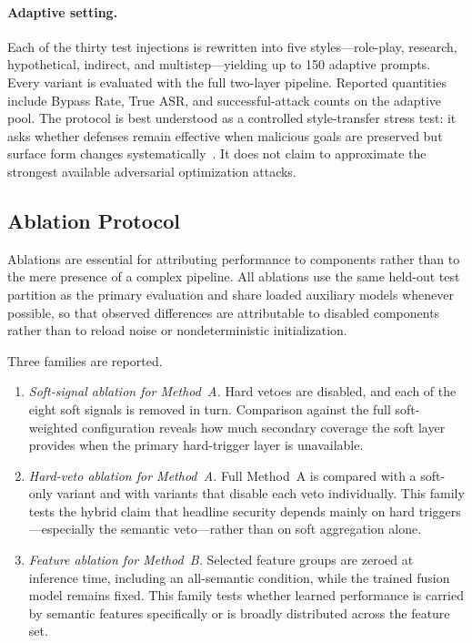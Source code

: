 \documentclass{article}
\begin{document}
\paragraph{Adaptive setting.}
Each of the thirty test injections is rewritten into five styles---role-play, research, hypothetical, indirect, and multistep---yielding up to 150 adaptive prompts.
Every variant is evaluated with the full two-layer pipeline.
Reported quantities include Bypass Rate, True ASR, and successful-attack counts on the adaptive pool.
The protocol is best understood as a controlled style-transfer stress test: it asks whether defenses remain effective when malicious goals are preserved but surface form changes systematically~\cite{promptfoo2024owasp,zizzo2025adversarial}.
It does not claim to approximate the strongest available adversarial optimization attacks.

\subsection{Ablation Protocol}
\label{sec:ablation-setup}

Ablations are essential for attributing performance to components rather than to the mere presence of a complex pipeline.
All ablations use the same held-out test partition as the primary evaluation and share loaded auxiliary models whenever possible, so that observed differences are attributable to disabled components rather than to reload noise or nondeterministic initialization.

Three families are reported.

\begin{enumerate}
  \item \emph{Soft-signal ablation for Method~A.}
    Hard vetoes are disabled, and each of the eight soft signals is removed in turn.
    Comparison against the full soft-weighted configuration reveals how much secondary coverage the soft layer provides when the primary hard-trigger layer is unavailable.
  \item \emph{Hard-veto ablation for Method~A.}
    Full Method~A is compared with a soft-only variant and with variants that disable each veto individually.
    This family tests the hybrid claim that headline security depends mainly on hard triggers---especially the semantic veto---rather than on soft aggregation alone.
  \item \emph{Feature ablation for Method~B.}
    Selected feature groups are zeroed at inference time, including an all-semantic condition, while the trained fusion model remains fixed.
    This family tests whether learned performance is carried by semantic features specifically or is broadly distributed across the feature set.
\end{enumerate}
\end{document}
